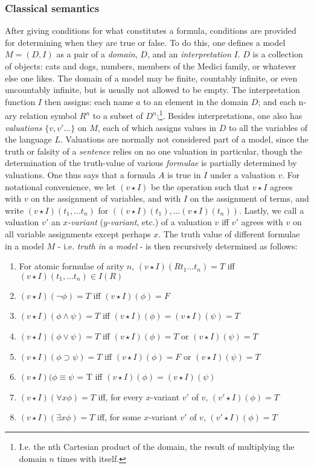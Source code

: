 \documentclass[]{article}
\begin{document}
\subsubsection{Classical semantics}
After giving conditions for what constitutes a formula, conditions are provided for determining when they are true or false. To do this, one defines a model $M = (D, I)$ as a pair of a \textit{domain}, $D$, and an \textit{interpretation} $I$. $D$ is  a collection of objects: cats and dogs, numbers, members of the Medici family, or whatever else one likes. The domain of a model may be finite, countably infinite, or even uncountably infinite, but is usually not allowed to be empty. The interpretation function $I$ then assigns: each name $a$ to an element in the domain $D$; and each n-ary relation symbol $R^{n}$ to a subset of $D^{n}$;\footnote{I.e. the nth Cartesian product of the domain, the result of multiplying the domain $n$ times with itself.}. Besides interpretations, one also has \textit{valuations} $\{v, v' ...\}$ on $M$, each of which assigns values in $D$ to all the variables of the language $L$. Valuations are normally not considered part of a model, since the truth or falsity of a \textit{sentence} relies on no one valuation in particular, though the determination of the truth-value of various \textit{formulae} is partially determined by valuations. One thus says that a formula $A$ is true in $I$ under a valuation $v$. For notational convenience, we let $(v \star I)$ be the operation such that $v \star I$ agrees with $v$ on the assignment of variables, and with $I$ on the assignment of terms, and write $(v \star I)(t_{1}, ...t_{n})$ for $((v \star I)(t_{1}), ... (v \star I)(t_{n}))$. Lastly, we call a valuation $v'$ an \textit{$x$-variant} (\textit{$y$-variant}, etc.) of a valuation $v$ iff $v'$ agrees with $v$ on all variable assignments except perhaps $x$. The truth value of different formulae in a model $M$ - i.e. \textit{truth in a model} - is then recursively determined as follows:

\begin{enumerate}
\item For atomic formulae of arity $n$, $(v \star I)(Rt_{1}...t_{n}) = T$ iff $(v \star I)(t_{1}, ... t_{n}) \in I(R)$
\item $(v \star I)(\neg\phi) = T$ iff $(v \star I)(\phi) = F$
\item $(v \star I)(\phi \wedge \psi) = T$ iff $(v \star I)(\phi) = (v \star I)(\psi) = T$
\item $(v \star I)(\phi \vee \psi) = T$ iff $(v \star I)(\phi) = T$ or $(v \star I)(\psi) = T$
\item $(v \star I)(\phi \supset \psi) = T$ iff $(v \star I)(\phi) = F$ or $(v \star I)(\psi) = T$
\item $(v \star I)(\phi \equiv \psi$ = T iff $(v \star I)(\phi) = (v \star I)(\psi)$
\item $(v \star I)(\forall x \phi) = T$ iff, for every $x$-variant $v'$ of $v$, $(v' \star I)(\phi) = T$
\item $(v \star I)(\exists x \phi) = T$ iff, for some $x$-variant $v'$ of $v$, $(v' \star I)(\phi) = T$
\end{enumerate}
\end{document}
